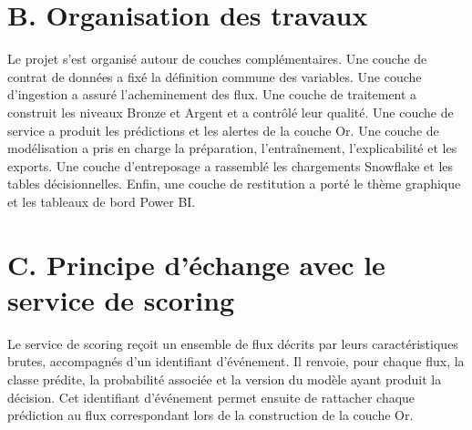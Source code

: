 \documentclass[12pt,a4paper,oneside]{report}
\begin{document}
\section*{B. Organisation des travaux}
Le projet s'est organisé autour de couches complémentaires. Une couche de contrat de données a fixé la définition commune des variables. Une couche d'ingestion a assuré l'acheminement des flux. Une couche de traitement a construit les niveaux Bronze et Argent et a contrôlé leur qualité. Une couche de service a produit les prédictions et les alertes de la couche Or. Une couche de modélisation a pris en charge la préparation, l'entraînement, l'explicabilité et les exports. Une couche d'entreposage a rassemblé les chargements Snowflake et les tables décisionnelles. Enfin, une couche de restitution a porté le thème graphique et les tableaux de bord Power BI.

\section*{C. Principe d'échange avec le service de scoring}
Le service de scoring reçoit un ensemble de flux décrits par leurs caractéristiques brutes, accompagnés d'un identifiant d'événement. Il renvoie, pour chaque flux, la classe prédite, la probabilité associée et la version du modèle ayant produit la décision. Cet identifiant d'événement permet ensuite de rattacher chaque prédiction au flux correspondant lors de la construction de la couche Or.
\end{document}
